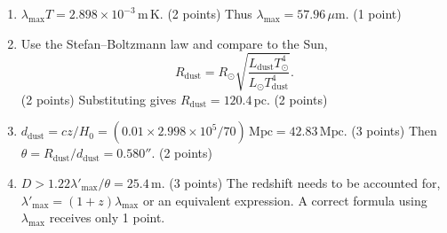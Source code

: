 \begin{enumerate}
\item $\lambda_{\max}T=2.898\times10^{-3}\,\mathrm{m\,K}$. \hfill(2 points)
Thus $\lambda_{\max}=57.96\,\mu\mathrm m$. \hfill(1 point)
\item Use the Stefan--Boltzmann law and compare to the Sun,
\[R_{\mathrm{dust}}=R_\odot\sqrt{\frac{L_{\mathrm{dust}}T_\odot^4}{L_\odot T_{\mathrm{dust}}^4}}.\]
\hfill(2 points)
Substituting gives $R_{\mathrm{dust}}=120.4\,\mathrm{pc}$. \hfill(2 points)
\item $d_{\mathrm{dust}}=cz/H_0=(0.01\times2.998\times10^5/70)\,\mathrm{Mpc}=42.83\,\mathrm{Mpc}$. \hfill(3 points)
Then $\theta=R_{\mathrm{dust}}/d_{\mathrm{dust}}=0.580''$. \hfill(2 points)
\item $D>1.22\lambda'_{\max}/\theta=25.4\,\mathrm m$. \hfill(3 points)
The redshift needs to be accounted for, $\lambda'_{\max}=(1+z)\lambda_{\max}$ or an equivalent expression. A correct formula using $\lambda_{\max}$ receives only 1 point.
\end{enumerate}
